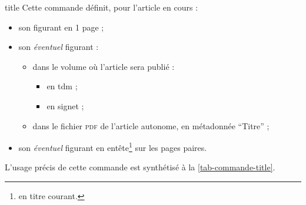 \documentclass[english,nolocaltoc]{nwejmart}
\newtheorem[style=definition]{fait}
\newtheorem[title=expérience]{experience}
\newtheorem[title-plural=anneaux]{anneau}
\newtheorem[title=idéal,title-plural=idéaux]{ideal}
\begin{document}
\begin{docCommand}[doc new=2017-10-23]{title}{}
  Cette commande définit, pour l'article en cours :
  \begin{itemize}
  \item son  figurant en 1\iere{} page ;
  \item son \emph{éventuel}  figurant :
    \begin{itemize}
    \item dans le volume où l'article sera publié :
      \begin{itemize}
      \item en \gls{tdm} ;
      \item en signet ;
      \end{itemize}
    \item dans le fichier \textsc{pdf} de l'article autonome, en métadonnée
      \enquote{Titre} ;
    \end{itemize}
  \item son \emph{éventuel}  figurant en
    entête\footnote{\Ie{} en titre courant.} sur les pages paires.
  \end{itemize}
  L'usage précis de cette commande est synthétisé à la
  \vref{tab-commande-title}.
\end{docCommand}
\end{document}

